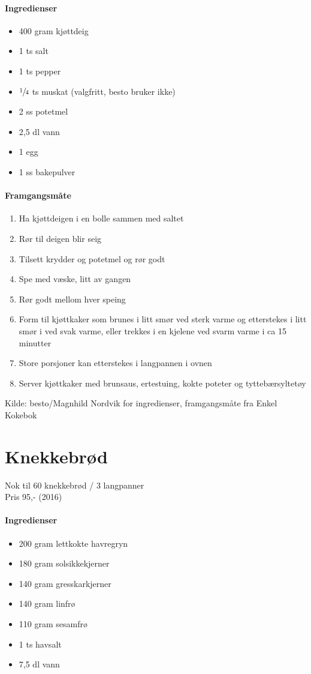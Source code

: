 \documentclass[12pt,a4paper]{book}
\begin{document}
\paragraph{Ingredienser}
\begin{itemize}[noitemsep]
	\item 400 gram kjøttdeig
	\item 1 ts salt
	\item 1 ts pepper
	\item $\sfrac{1}{4}$  ts muskat (valgfritt, besto bruker ikke)
	\item 2 ss potetmel
	\item 2,5 dl vann
	\item 1 egg
	\item 1 ss bakepulver
\end{itemize}

\paragraph{Framgangsmåte}
\begin{enumerate}[noitemsep]
	\item Ha kjøttdeigen i en bolle sammen med saltet
	\item Rør til deigen blir seig
	\item Tilsett krydder og potetmel og rør godt
	\item Spe med væske, litt av gangen
	\item Rør godt mellom hver speing
	\item Form til kjøttkaker som brunes i litt smør ved sterk varme og etterstekes i litt smør i ved svak varme, eller trekkes i en kjelene ved svarm varme i ca 15 minutter
	\item Store porsjoner kan etterstekes i langpannen i ovnen
	\item Server kjøttkaker med brunsaus, ertestuing, kokte poteter og tyttebærsyltetøy
\end{enumerate}


Kilde: besto/Magnhild Nordvik for ingredienser, framgangsmåte fra Enkel Kokebok
\clearpage{}
\clearpage{}\section{﻿Knekkebrød}
Nok til 60 knekkebrød / 3 langpanner\\
Pris 95,- (2016)

\paragraph{Ingredienser}
\begin{itemize}[noitemsep]
	\item 200 gram lettkokte havregryn
	\item 180 gram solsikkekjerner
	\item 140 gram gresskarkjerner
	\item 140 gram linfrø
	\item 110 gram sesamfrø
	\item 1 ts havsalt
	\item 7,5 dl vann
\end{itemize}
\end{document}
